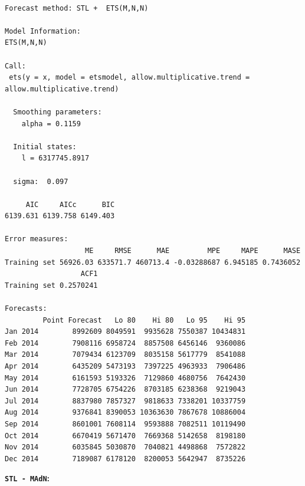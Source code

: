 \documentclass[openany]{book}
\begin{document}
\begin{verbatim}

Forecast method: STL +  ETS(M,N,N)

Model Information:
ETS(M,N,N) 

Call:
 ets(y = x, model = etsmodel, allow.multiplicative.trend = allow.multiplicative.trend) 

  Smoothing parameters:
    alpha = 0.1159 

  Initial states:
    l = 6317745.8917 

  sigma:  0.097

     AIC     AICc      BIC 
6139.631 6139.758 6149.403 

Error measures:
                   ME     RMSE      MAE         MPE     MAPE      MASE
Training set 56926.03 633571.7 460713.4 -0.03288687 6.945185 0.7436052
                  ACF1
Training set 0.2570241

Forecasts:
         Point Forecast   Lo 80    Hi 80   Lo 95    Hi 95
Jan 2014        8992609 8049591  9935628 7550387 10434831
Feb 2014        7908116 6958724  8857508 6456146  9360086
Mar 2014        7079434 6123709  8035158 5617779  8541088
Apr 2014        6435209 5473193  7397225 4963933  7906486
May 2014        6161593 5193326  7129860 4680756  7642430
Jun 2014        7728705 6754226  8703185 6238368  9219043
Jul 2014        8837980 7857327  9818633 7338201 10337759
Aug 2014        9376841 8390053 10363630 7867678 10886004
Sep 2014        8601001 7608114  9593888 7082511 10119490
Oct 2014        6670419 5671470  7669368 5142658  8198180
Nov 2014        6035845 5030870  7040821 4498868  7572822
Dec 2014        7189087 6178120  8200053 5642947  8735226
\end{verbatim}

\textbf{\texttt{STL\ -\ MAdN}:}
\end{document}
